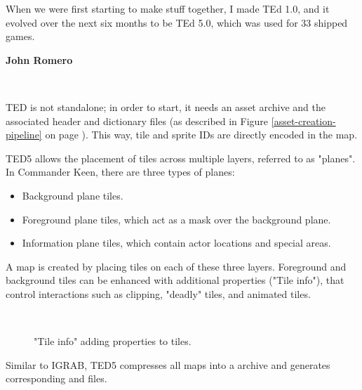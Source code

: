 \documentclass[book.tex]{subfiles}
\begin{document}
\par
\begin{fancyquotes}
When we were first starting to make stuff together, I made TEd 1.0, and it evolved over the next six months to be TEd 5.0, which was used for 33 shipped games.\\
\par
\textbf{John Romero\protect\footnotemark}
\end{fancyquotes}\\
\addtocounter{footnote}{-1}

\par
TED is not standalone; in order to start, it needs an asset archive and the associated header and dictionary files (as described in Figure \ref{asset-creation-pipeline} on page \pageref{asset-creation-pipeline}). This way, tile and sprite IDs are directly encoded in the map.\\

\vspace{-3pt}
 
TED5 allows the placement of tiles across multiple layers, referred to as "planes". In Commander Keen, there are three types of planes: 
\begin{itemize}
  \item Background plane tiles.
  \item Foreground plane tiles, which act as a mask over the background plane.
  \item Information plane tiles, which contain actor locations and special areas.
\end{itemize}

A map is created by placing tiles on each of these three layers. Foreground and background tiles can be enhanced with additional properties ("Tile info"), that control interactions such as clipping, "deadly" tiles, and animated tiles. 

\par
\begin{figure}[H] 
  \centering 
  \\
  \caption{"Tile info" adding properties to tiles.}
\end{figure} 

 
\par
Similar to IGRAB, TED5 compresses all maps into a  archive and generates corresponding  and  files.
\end{document}
